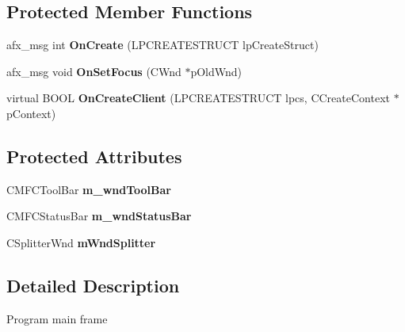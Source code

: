 \subsection*{Protected Member Functions}
\begin{DoxyCompactItemize}
\item 
\hypertarget{class_c_main_frame_a48666466fd37412fcaeff75c3b12e0ed}{}afx\+\_\+msg int {\bfseries On\+Create} (L\+P\+C\+R\+E\+A\+T\+E\+S\+T\+R\+U\+C\+T lp\+Create\+Struct)\label{class_c_main_frame_a48666466fd37412fcaeff75c3b12e0ed}

\item 
\hypertarget{class_c_main_frame_adc353a3d1fc497fbc009b6d9e6914a82}{}afx\+\_\+msg void {\bfseries On\+Set\+Focus} (C\+Wnd $\ast$p\+Old\+Wnd)\label{class_c_main_frame_adc353a3d1fc497fbc009b6d9e6914a82}

\item 
\hypertarget{class_c_main_frame_ac863d694fd3637d492ef97396defbd8e}{}virtual B\+O\+O\+L {\bfseries On\+Create\+Client} (L\+P\+C\+R\+E\+A\+T\+E\+S\+T\+R\+U\+C\+T lpcs, C\+Create\+Context $\ast$p\+Context)\label{class_c_main_frame_ac863d694fd3637d492ef97396defbd8e}

\end{DoxyCompactItemize}
\subsection*{Protected Attributes}
\begin{DoxyCompactItemize}
\item 
\hypertarget{class_c_main_frame_ac8558942627d1502b5095e736840a1f3}{}C\+M\+F\+C\+Tool\+Bar {\bfseries m\+\_\+wnd\+Tool\+Bar}\label{class_c_main_frame_ac8558942627d1502b5095e736840a1f3}

\item 
\hypertarget{class_c_main_frame_a5842bded00e9137fbbf77343b99863be}{}C\+M\+F\+C\+Status\+Bar {\bfseries m\+\_\+wnd\+Status\+Bar}\label{class_c_main_frame_a5842bded00e9137fbbf77343b99863be}

\item 
\hypertarget{class_c_main_frame_a1d68466db594c4bebf41f707bc0a0647}{}C\+Splitter\+Wnd {\bfseries m\+Wnd\+Splitter}\label{class_c_main_frame_a1d68466db594c4bebf41f707bc0a0647}

\end{DoxyCompactItemize}


\subsection{Detailed Description}
Program main frame 

